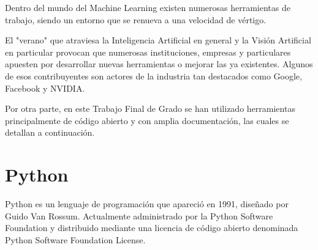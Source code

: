 \documentclass[../main.tex]{subfiles}
\begin{document}
Dentro del mundo del Machine Learning existen numerosas herramientas de trabajo, siendo un entorno que se renueva a una velocidad de vértigo. \newline

El "verano" que atraviesa la Inteligencia Artificial en general y la Visión Artificial en particular provocan que numerosas instituciones, empresas y particulares apuesten por desarrollar nuevas herramientas o mejorar las ya existentes. Algunos de esos contribuyentes son actores de la industria tan destacados como Google, Facebook y NVIDIA.
\newline

Por otra parte, en este Trabajo Final de Grado se han utilizado herramientas principalmente de código abierto y con amplia documentación, las cuales se detallan a continuación.
\section{Python}
Python es un lenguaje de programación que apareció en 1991, diseñado por Guido Van Rossum. Actualmente administrado por la Python Software Foundation y distribuido mediante una licencia de código abierto denominada Python Software Foundation License. \newline
\end{document}
